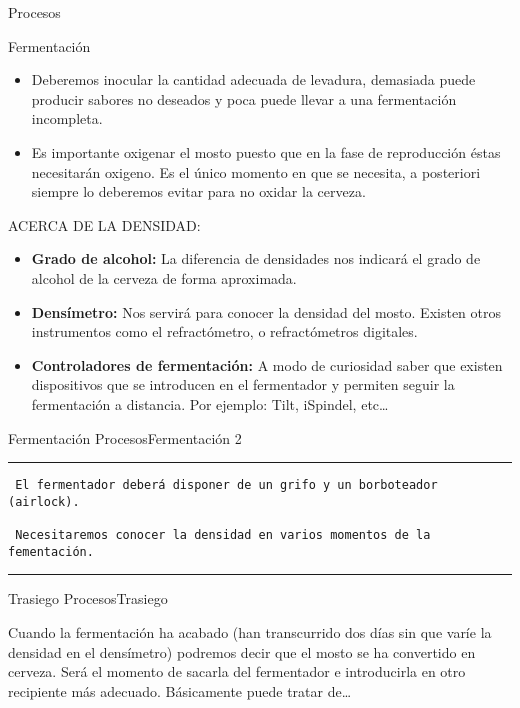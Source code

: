 \begin{frame}[fragile]{Procesos}
\begin{block}{Fermentación}
\begin{itemize}
\item
  Deberemos inocular la cantidad adecuada de levadura, demasiada puede
  producir sabores no deseados y poca puede llevar a una fermentación
  incompleta.
\item
  Es importante oxigenar el mosto puesto que en la fase de reproducción
  éstas necesitarán oxigeno. Es el único momento en que se necesita, a
  posteriori siempre lo deberemos evitar para no oxidar la cerveza.
\end{itemize}

ACERCA DE LA DENSIDAD:

\begin{itemize}
\item
  \textbf{Grado de alcohol:} La diferencia de densidades nos indicará el
  grado de alcohol de la cerveza de forma aproximada.
\item
  \textbf{Densímetro:} Nos servirá para conocer la densidad del mosto.
  Existen otros instrumentos como el refractómetro, o refractómetros
  digitales.
\item
  \textbf{Controladores de fermentación:} A modo de curiosidad saber que
  existen dispositivos que se introducen en el fermentador y permiten
  seguir la fermentación a distancia. Por ejemplo: Tilt, iSpindel,
  etc\ldots{}
\end{itemize}
\end{block}

\begin{block}{Fermentación}
\protect\hypertarget{fermentaciuxf3n-1}{}
ProcesosFermentación 2

\begin{center}\rule{0.5\linewidth}{0.5pt}\end{center}

\begin{verbatim}
 El fermentador deberá disponer de un grifo y un borboteador (airlock).
 
 Necesitaremos conocer la densidad en varios momentos de la fementación.
\end{verbatim}

\begin{center}\rule{0.5\linewidth}{0.5pt}\end{center}
\end{block}

\begin{block}{Trasiego}
\protect\hypertarget{trasiego}{}
ProcesosTrasiego

Cuando la fermentación ha acabado (han transcurrido dos días sin que
varíe la densidad en el densímetro) podremos decir que el mosto se ha
convertido en cerveza. Será el momento de sacarla del fermentador e
introducirla en otro recipiente más adecuado. Básicamente puede tratar
de\ldots{}\\


\end{block}
\end{frame}

